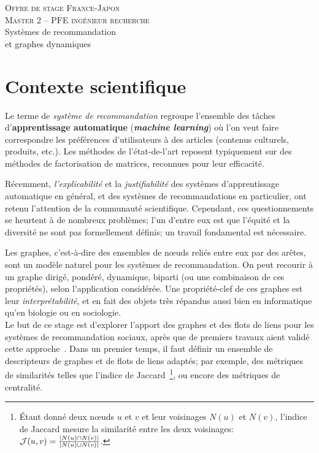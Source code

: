 \documentclass[a4paper, 12pt]{article}
\newcommand{\dest}{ 
    \textsc{\Large Offre de stage France-Japon\\ 
    Master 2 -- PFE ingénieur recherche}\\[1ex]
    {\Huge Systèmes de recommandation \\
    et graphes dynamiques}
  }
\begin{document}
\pagestyle{fancy} 

\addvspace{1cm}
\begin{center}
  \dest
\end{center}

\addvspace{1cm}

\section*{Contexte scientifique}

Le terme de {\em système de recommandation} regroupe l'ensemble des tâches d'{\bf apprentissage automatique} ({\bf {\em machine learning}}) où l'on veut faire correspondre les préférences d'utilisateurs à des articles (contenus culturels, produits, etc.). Les méthodes de l'état-de-l'art reposent typiquement sur des méthodes de factorisation de matrices, reconnues pour leur efficacité.

Récemment, {\em l'explicabilité} et la {\em justifiabilité} des systèmes d'apprentissage automatique en général, et des systèmes de recommandations en particulier, ont retenu l'attention de la communauté scientifique.
Cependant, ces questionnements se heurtent à de nombreux problèmes; l'un d'entre eux est que l'équité et la diversité ne sont pas formellement définis; un travail fondamental est nécessaire.

Les graphes, c'est-à-dire des ensembles de n\oe{}uds reliés entre eux par des arêtes, sont un modèle naturel pour les systèmes de recommandation.
On peut recourir à un graphe dirigé, pondéré, dynamique, biparti (ou une combinaison de ces propriétés), selon l'application considérée.
Une propriété-clef de ces graphes est leur {\em interprétabilité}, et en fait des objets très répandus aussi bien en informatique qu'en biologie ou en sociologie.\\

Le but de ce stage est d'explorer l'apport des graphes et des flots de liens pour les systèmes de recommandation sociaux, après que de premiers travaux aient validé cette approche~\cite{viard2018augmenting}.
Dans un premier temps, il faut définir un ensemble de descripteurs de graphes et de flots de liens adaptés; par exemple, des métriques de similarités telles que l'indice de Jaccard~\footnote{Étant donné deux n\oe{}uds $u$ et $v$ et leur voisinages $N(u)$ et $N(v)$, l'indice de Jaccard mesure la similarité entre les deux voisinages: ${\cal J}(u,v) = \frac{|N(u)\cap N(v)|}{|N(u) \cup N(v)|}$.}, ou encore des métriques de centralité.
\end{document}
